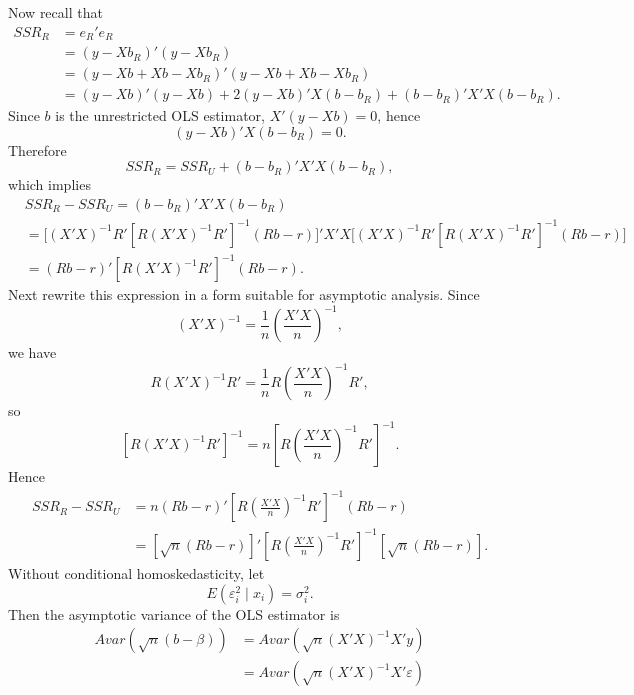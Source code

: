 \documentclass[12pt, letterpaper, onecolumn]{exam}
\begin{document}
\begin{solution}
    Now recall that
    \begin{align*}
        SSR_{R} & =e_{R}'e_{R}                                              \\
                & =(y-Xb_{R})'(y-Xb_{R})                                    \\
                & =(y-Xb+Xb-Xb_{R})'(y-Xb+Xb-Xb_{R})                        \\
                & =(y-Xb)'(y-Xb)+2(y-Xb)'X(b-b_{R})+(b-b_{R})'X'X(b-b_{R}).
    \end{align*}
    Since $b$ is the unrestricted OLS estimator, $X'(y-Xb)=0$, hence
    \[
        (y-Xb)'X(b-b_{R})=0.
    \]
    Therefore
    \[
        SSR_{R}=SSR_{U}+(b-b_{R})'X'X(b-b_{R}),
    \]
    which implies
    \begin{align*}
         & SSR_{R}-SSR_{U}=(b-b_{R})'X'X(b-b_{R})                                                                  \\
         & =\Big[(X'X)^{-1}R'[R(X'X)^{-1}R']^{-1}(Rb-r)\Big]' X'X \Big[(X'X)^{-1}R'[R(X'X)^{-1}R']^{-1}(Rb-r)\Big] \\
         & =(Rb-r)'[R(X'X)^{-1}R']^{-1}(Rb-r).
    \end{align*}
    Next rewrite this expression in a form suitable for asymptotic analysis.
    Since
    \[
        (X'X)^{-1}=\frac{1}{n}\left(\frac{X'X}{n}\right)^{-1},
    \]
    we have
    \[
        R(X'X)^{-1}R' =\frac{1}{n}R\left(\frac{X'X}{n}\right)^{-1}R',
    \]
    so
    \[
        [R(X'X)^{-1}R']^{-1}=n\left[R\left(\frac{X'X}{n}\right)^{-1}R'\right]
        ^{-1}.
    \]
    Hence
    \begin{align*}
        SSR_{R}-SSR_{U} & =n(Rb-r)'\left[R\left(\frac{X'X}{n}\right)^{-1}R'\right]^{-1}(Rb-r)                      \\
                        & =[\sqrt{n}(Rb-r)]' \left[R\left(\frac{X'X}{n}\right)^{-1}R'\right]^{-1}[\sqrt{n}(Rb-r)].
    \end{align*}
    Without conditional homoskedasticity, let
    \[
        E(\varepsilon_{i}^{2}\mid x_{i})=\sigma_{i}^{2}.
    \]
    Then the asymptotic variance of the OLS estimator is
    \begin{align*}
        Avar\!\left(\sqrt{n}(b-\beta)\right) & =Avar\!\left(\sqrt{n}(X'X)^{-1}X'y\right)                                         \\
                                             & =Avar\!\left(\sqrt{n}(X'X)^{-1}X'\varepsilon\right)                               \\

\end{align*}
\end{solution}
\end{document}
